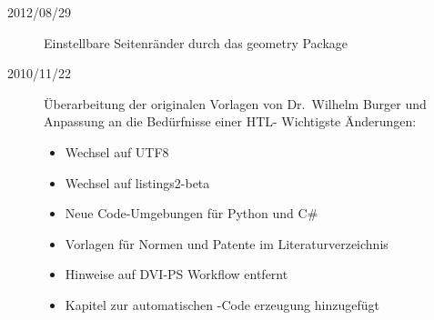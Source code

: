 \begin{sloppypar}
\begin{description}
\item[2012/08/29]
Einstellbare Seitenränder durch das geometry Package

\item[2010/11/22]
Überarbeitung der originalen Vorlagen von Dr.\ Wilhelm Burger und Anpassung an
die Bedürfnisse einer HTL-
Wichtigste Änderungen:
\begin{itemize}
  \item Wechsel auf UTF8
  \item Wechsel auf listings2-beta
  \item Neue Code-Umgebungen für Python und C\#
  \item Vorlagen für Normen und Patente im Literaturverzeichnis
  \item Hinweise auf DVI-PS Workflow entfernt
  \item Kapitel zur automatischen \latex-Code erzeugung hinzugefügt
\end{itemize}
%
\end{description}

\end{sloppypar}




